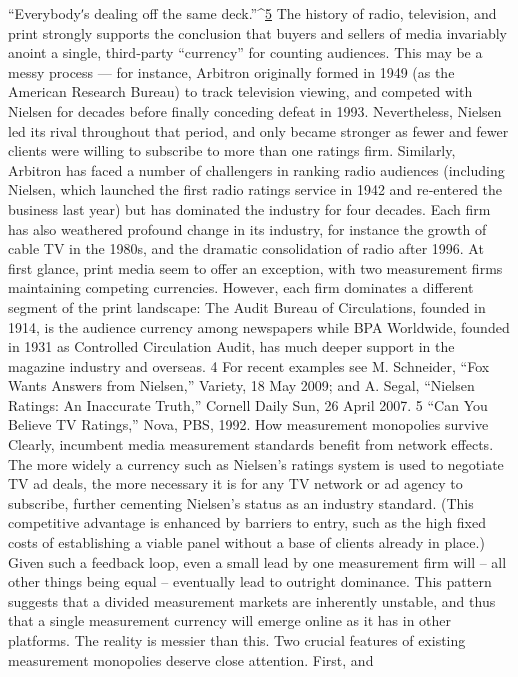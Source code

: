 ``Everybodyʹs dealing off the same deck.''^{\href{#endnotes}{5}}
The history of radio, television, and print strongly supports the conclusion
that buyers and sellers of media invariably anoint a single, third‐party
``currency'' for counting audiences. This may be a messy process — for
instance, Arbitron originally formed in 1949 (as the American Research
Bureau) to track television viewing, and competed with Nielsen for
decades before finally conceding defeat in 1993. Nevertheless, Nielsen led
its rival throughout that period, and only became stronger as fewer and
fewer clients were willing to subscribe to more than one ratings firm.
Similarly, Arbitron has faced a number of challengers in ranking radio
audiences (including Nielsen, which launched the first radio ratings
service in 1942 and re‐entered the business last year) but has dominated
the industry for four decades. Each firm has also weathered profound
change in its industry, for instance the growth of cable TV in the 1980s,
and the dramatic consolidation of radio after 1996.
At first glance, print media seem to offer an exception, with two
measurement firms maintaining competing currencies. However, each
firm dominates a different segment of the print landscape: The Audit
Bureau of Circulations, founded in 1914, is the audience currency among
newspapers while BPA Worldwide, founded in 1931 as Controlled
Circulation Audit, has much deeper support in the magazine industry and
overseas.
4 For recent examples see M. Schneider, ``Fox Wants Answers from Nielsen,'' Variety,
18 May 2009; and A. Segal, ``Nielsen Ratings: An Inaccurate Truth,'' Cornell Daily
Sun, 26 April 2007.
5 ``Can You Believe TV Ratings,'' Nova, PBS, 1992.
How measurement monopolies survive
Clearly, incumbent media measurement standards benefit from network
effects. The more widely a currency such as Nielsen’s ratings system is
used to negotiate TV ad deals, the more necessary it is for any TV network
or ad agency to subscribe, further cementing Nielsen’s status as an
industry standard. (This competitive advantage is enhanced by barriers to
entry, such as the high fixed costs of establishing a viable panel without a
base of clients already in place.) Given such a feedback loop, even a small
lead by one measurement firm will – all other things being equal –
eventually lead to outright dominance. This pattern suggests that a
divided measurement markets are inherently unstable, and thus that a
single measurement currency will emerge online as it has in other
platforms.
The reality is messier than this. Two crucial features of existing
measurement monopolies deserve close attention. First, and
